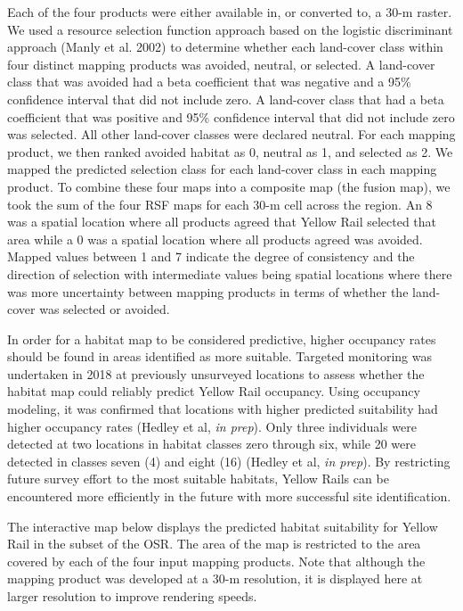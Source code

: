\documentclass[11pt,]{article}
\begin{document}
Each of the four products were either available in, or converted to, a
30-m raster. We used a resource selection function approach based on the
logistic discriminant approach (Manly et al. 2002) to determine whether
each land-cover class within four distinct mapping products was avoided,
neutral, or selected. A land-cover class that was avoided had a beta
coefficient that was negative and a 95\% confidence interval that did
not include zero. A land-cover class that had a beta coefficient that
was positive and 95\% confidence interval that did not include zero was
selected. All other land-cover classes were declared neutral. For each
mapping product, we then ranked avoided habitat as 0, neutral as 1, and
selected as 2. We mapped the predicted selection class for each
land-cover class in each mapping product. To combine these four maps
into a composite map (the fusion map), we took the sum of the four RSF
maps for each 30-m cell across the region. An 8 was a spatial location
where all products agreed that Yellow Rail selected that area while a 0
was a spatial location where all products agreed was avoided. Mapped
values between 1 and 7 indicate the degree of consistency and the
direction of selection with intermediate values being spatial locations
where there was more uncertainty between mapping products in terms of
whether the land-cover was selected or avoided.

In order for a habitat map to be considered predictive, higher occupancy
rates should be found in areas identified as more suitable. Targeted
monitoring was undertaken in 2018 at previously unsurveyed locations to
assess whether the habitat map could reliably predict Yellow Rail
occupancy. Using occupancy modeling, it was confirmed that locations
with higher predicted suitability had higher occupancy rates (Hedley et
al, \emph{in prep}). Only three individuals were detected at two
locations in habitat classes zero through six, while 20 were detected in
classes seven (4) and eight (16) (Hedley et al, \emph{in prep}). By
restricting future survey effort to the most suitable habitats, Yellow
Rails can be encountered more efficiently in the future with more
successful site identification.

The interactive map below displays the predicted habitat suitability for
Yellow Rail in the subset of the OSR. The area of the map is restricted
to the area covered by each of the four input mapping products. Note
that although the mapping product was developed at a 30-m resolution, it
is displayed here at larger resolution to improve rendering speeds.
\end{document}

